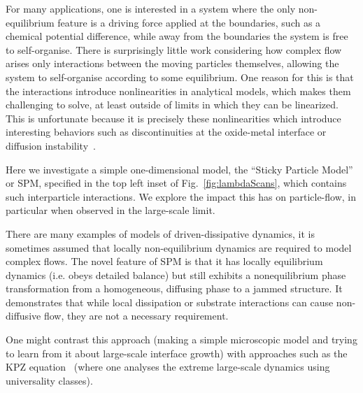 \documentclass[
reprint,
 amsmath,amssymb,
 aps,
 prl
]{revtex4-1}
\begin{document}
For many applications, one is interested in a system where the only
non-equilibrium feature is a driving force applied at the boundaries,
such as a chemical potential difference, while away from the
boundaries the system is free to self-organise.  There is surprisingly
little work considering how complex flow arises only interactions
between the moving particles themselves, allowing the system to
self-organise according to some equilibrium.  One reason for this is
that the interactions introduce nonlinearities in analytical models,
which makes them challenging to solve, at least outside of limits in
which they can be linearized. This is unfortunate because it is
precisely these nonlinearities which introduce interesting behaviors
such as discontinuities at the oxide-metal interface or diffusion
instability~\cite{Obukhovsky2017,Gorokhova2010}.

Here we investigate a simple one-dimensional model, the ``Sticky
Particle Model'' or SPM, specified in the top left inset of
Fig.~\ref{fig:lambdaScans}, which contains such interparticle
interactions.  We explore the impact this has on particle-flow, in
particular when observed in the large-scale limit.

There are many examples of models of driven-dissipative dynamics, it
is sometimes assumed that locally non-equilibrium dynamics are
required to model complex flows. The novel feature of SPM is that it
has locally equilibrium dynamics (i.e. obeys detailed balance) but
still exhibits a nonequilibrium phase transformation from a
homogeneous, diffusing phase to a jammed structure.  It demonstrates that while local
dissipation or substrate interactions can cause non-diffusive flow,
they are not a necessary requirement.


One might contrast this
approach (making a simple microscopic model and trying to learn from
it about large-scale interface growth) with approaches such as the KPZ
equation~\cite{PhysRevLett.56.889, PhysRevA.38.4271, Sasamoto2010}
(where one analyses the extreme large-scale dynamics using
universality classes).
\end{document}
